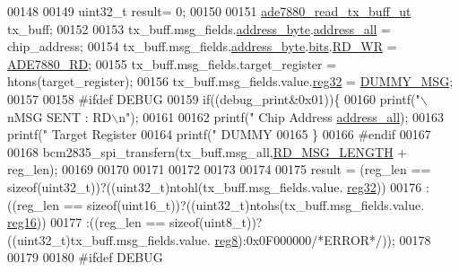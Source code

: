 \begin{DoxyCode}
00148    
00149   uint32\_t result= 0;
00150 
00151     \hyperlink{a00016}{ade7880\_read\_tx\_buff\_ut} tx\_buff;
00152     
00153     tx\_buff.msg\_fields.\hyperlink{a00016_af6a65bac733ea3e9b1d24b065163d49a}{address\_byte}.\hyperlink{a00011_a7bf6defa0ae3fb2bca057a3a97d4f740}{address\_all} = chip\_address;
00154     tx\_buff.msg\_fields.\hyperlink{a00016_af6a65bac733ea3e9b1d24b065163d49a}{address\_byte}.\hyperlink{a00011_ae121725fb28cc26495969d71e0e0d42e}{bits}.\hyperlink{a00011_a97e2668c8e5470fa66185f16dc2e8045}{RD\_WR} = \hyperlink{a00041_a30e8f63608e6153585d75dc479a03177}{ADE7880\_RD};
00155     tx\_buff.msg\_fields.target\_register = htons(target\_register);
00156     tx\_buff.msg\_fields.value.\hyperlink{a00016_a83e2be8d3feb1bcbc286bfaae10ac552}{reg32} = \hyperlink{a00041_af87bc226c5bc1e648d8ceac69ccf2bcb}{DUMMY\_MSG};
00157 
00158 \textcolor{preprocessor}{    #ifdef DEBUG}
00159 \textcolor{preprocessor}{}     \textcolor{keywordflow}{if}((debug\_print&0x01))\{
00160        printf(\textcolor{stringliteral}{"\(\backslash\)nMSG SENT  : RD\(\backslash\)n"});
00161        
00162        printf(\textcolor{stringliteral}{"        Chip Address %
      \hyperlink{a00011_a7bf6defa0ae3fb2bca057a3a97d4f740}{address\_all});
00163        printf(\textcolor{stringliteral}{"        Target Register %
00164        printf(\textcolor{stringliteral}{"        DUMMY %
00165        \}
00166 \textcolor{preprocessor}{    #endif}
00167 \textcolor{preprocessor}{}    
00168     bcm2835\_spi\_transfern(tx\_buff.msg\_all,\hyperlink{a00041_a0f0795755fb9e8e47c78c1289e091282}{RD\_MSG\_LENGTH} + reg\_len);    
00169     
00170     
00171               
00172     
00173     
00174     
00175     result =  (reg\_len == \textcolor{keyword}{sizeof}(uint32\_t))?((uint32\_t)ntohl(tx\_buff.msg\_fields.value.
      \hyperlink{a00016_a83e2be8d3feb1bcbc286bfaae10ac552}{reg32}))
00176              :((reg\_len == \textcolor{keyword}{sizeof}(uint16\_t))?((uint32\_t)ntohs(tx\_buff.msg\_fields.value.
      \hyperlink{a00016_a0c22d234d52e616d449a8c264bf2030b}{reg16}))
00177              :((reg\_len == \textcolor{keyword}{sizeof}(uint8\_t))?((uint32\_t)tx\_buff.msg\_fields.value.
      \hyperlink{a00016_a90b3f782e917edca7101e7803a3773b7}{reg8}):0x0F000000\textcolor{comment}{/*ERROR*/}));
00178     
00179     
00180 \textcolor{preprocessor}{    #ifdef DEBUG}
}}}
\end{DoxyCode}
